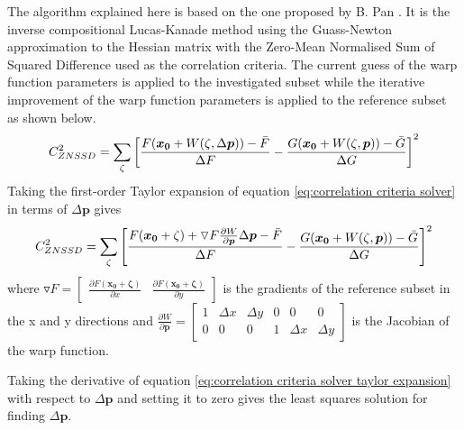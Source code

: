 \documentclass[[12pt,oneside,openany,a4paper, %
\newcommand*\mean[1]{\bar{#1}} %
\begin{document}
The algorithm explained here is based on the one proposed by B. Pan \cite{panfast}. It is the inverse compositional Lucas-Kanade method using the Guass-Newton approximation to the Hessian matrix with the Zero-Mean Normalised Sum of Squared Difference used as the correlation criteria. The current guess of the warp function parameters is applied to the investigated subset while the iterative improvement of the warp function parameters is applied to the reference subset as shown below.
\begin{equation}
  C_{ZNSSD}^2 = \sum_{\zeta}  \left[ \frac{F(\bm{x_0}+W(\zeta,\Delta \bm{p}))-\mean{F}}{\Delta F} -\frac{G(\bm{x_0}+W(\zeta,\bm{p}))-\mean{G}}{\Delta G}\right]^2
  \label{eq:correlation criteria solver}
\end{equation}
Taking the first-order Taylor expansion of equation \ref{eq:correlation criteria solver} in terms of $\Delta \bm{p}$ gives
\begin{equation}
  C_{ZNSSD}^2 = \sum_{\zeta}  \left[ \frac{F(\bm{x_0}+\zeta)+\triangledown F \frac{\partial W}{\partial \bm{p}} \Delta\bm{p}-\mean{F}}{\Delta F} -\frac{G(\bm{x_0}+W(\zeta,\bm{p}))-\mean{G}}{\Delta G}\right]^2
  \label{eq:correlation criteria solver taylor expansion}
\end{equation}
where $\triangledown F = \begin{bmatrix} \frac{\partial F(\bm{x_0} + \bm{\zeta})}{\partial x} & \frac{\partial F(\bm{x_0} + \bm{\zeta})}{\partial y} \end{bmatrix}$ is the gradients of the reference subset in the x and y directions and $\frac{\partial W}{\partial \bm{p}} = \begin{bmatrix} 1 & \Delta x & \Delta y & 0 & 0 & 0 \\ 0 & 0 & 0 & 1 & \Delta x & \Delta y \end{bmatrix}$ is the Jacobian of the warp function.

Taking the derivative of equation \ref{eq:correlation criteria solver taylor expansion} with respect to $\Delta \bm{p}$ and setting it to zero gives the least squares solution for finding $\Delta \bm{p}$.
\end{document}

